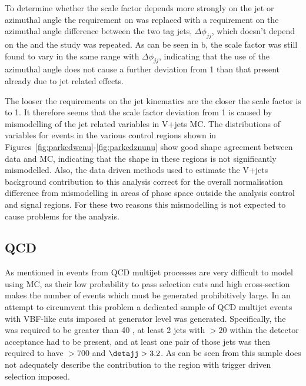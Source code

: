 To determine whether the scale factor depends more strongly on the jet or \METnoMU azimuthal angle the requirement on \jetmetdphi was replaced with a requirement on the azimuthal angle difference between the two tag jets, $\Delta\phi_{jj}$, which doesn't depend on the \METnoMU and the study was repeated. As can be seen in b, the scale factor was still found to vary in the same range with $\Delta\phi_{jj}$, indicating that the use of the \METnoMU azimuthal angle does not cause a further deviation from 1 than that present already due to jet related effects.

The looser the requirements on the jet kinematics are the closer the scale factor is to 1. It therefore seems that the scale factor deviation from 1 is caused by mismodelling of the jet related variables in V+jets \ac{MC}. The distributions of variables for events in the various control regions shown in Figures~\ref{fig:parkedwenu}-\ref{fig:parkedznunu} show good shape agreement between data and \ac{MC}, indicating that the shape in these regions is not significantly mismodelled. Also, the data driven methods used to estimate the V+jets background contribution to this analysis correct for the overall normalisation difference from mismodelling in areas of phase space outside the analysis control and signal regions. For these two reasons this mismodelling is not expected to cause problems for the analysis.

\subsection{QCD}
\label{sec:parkedQCD}
As mentioned in  events from \ac{QCD} multijet processes are very difficult to model using \ac{MC}, as their low probability to pass selection cuts and high cross-section makes the number of events which must be generated prohibitively large. In an attempt to circumvent this problem a dedicated sample of \ac{QCD} multijet events with \ac{VBF}-like cuts imposed at generator level was generated. Specifically, the \MET was required to be greater than 40 \GeV, at least 2 jets with \pt$>20$ within the detector acceptance had to be present, and at least one pair of those jets was then required to have \Mjj$>700$ \GeV and $\detajj>3.2$. As can be seen from  this sample does not adequately describe the contribution to the region with trigger driven selection imposed. 

